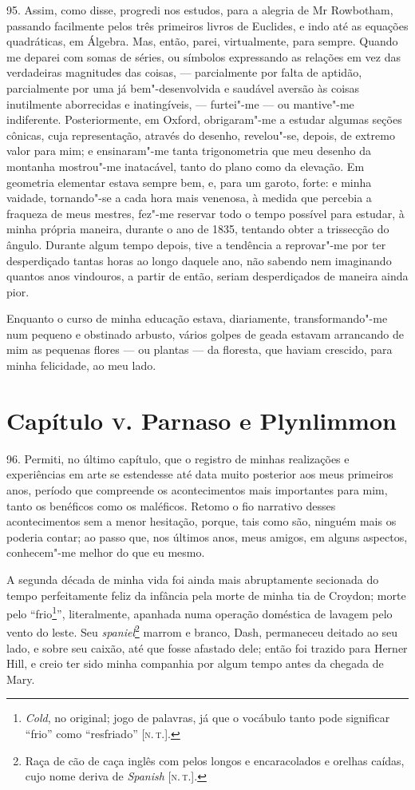 95. Assim, como disse, progredi nos estudos, para a alegria de Mr
Rowbotham, passando facilmente pelos três primeiros livros de Euclides,
e indo até as equações quadráticas, em Álgebra. Mas, então, parei,
virtualmente, para sempre. Quando me deparei com somas de séries, ou
símbolos expressando as relações em vez das verdadeiras magnitudes das
coisas, --- parcialmente por falta de aptidão, parcialmente por uma já
bem"-desenvolvida e saudável aversão às coisas inutilmente aborrecidas e
inatingíveis, --- furtei"-me --- ou mantive"-me indiferente. Posteriormente,
em Oxford, obrigaram"-me a estudar algumas seções cônicas, cuja
representação, através do desenho, revelou"-se, depois, de extremo valor
para mim; e ensinaram"-me tanta trigonometria que meu desenho da montanha
mostrou"-me inatacável, tanto do plano como da elevação. Em geometria
elementar estava sempre bem, e, para um garoto, forte: e minha vaidade,
tornando"-se a cada hora mais venenosa, à medida que percebia a fraqueza
de meus mestres, fez"-me reservar todo o tempo possível para estudar, à
minha própria maneira, durante o ano de 1835, tentando obter a
trissecção do ângulo. Durante algum tempo depois, tive a tendência a
reprovar"-me por ter desperdiçado tantas horas ao longo daquele ano, não
sabendo nem imaginando quantos anos vindouros, a partir de então, seriam
desperdiçados de maneira ainda pior.

Enquanto o curso de minha educação estava, diariamente, transformando"-me
num pequeno e obstinado arbusto, vários golpes de geada estavam
arrancando de mim as pequenas flores --- ou plantas --- da floresta, que
haviam crescido, para minha felicidade, ao meu lado.

\chapter{Capítulo \textsc{v}. Parnaso e Plynlimmon}

96. Permiti, no último capítulo, que o registro de minhas realizações e
experiências em arte se estendesse até data muito posterior aos meus
primeiros anos, período que compreende os acontecimentos mais
importantes para mim, tanto os benéficos como os maléficos. Retomo o fio
narrativo desses acontecimentos sem a menor hesitação, porque, tais como
são, ninguém mais os poderia contar; ao passo que, nos últimos anos,
meus amigos, em alguns aspectos, conhecem"-me melhor do que eu mesmo.

A segunda década de minha vida foi ainda mais abruptamente secionada do
tempo perfeitamente feliz da infância pela morte de minha tia de
Croydon; morte pelo ``frio\footnote{\emph{Cold}, no original; jogo de
  palavras, já que o vocábulo tanto pode significar ``frio'' como
  ``resfriado'' {[}\textsc{n.\,t.}{]}.}'', literalmente, apanhada numa operação
doméstica de lavagem pelo vento do leste. Seu \emph{spaniel}\footnote{Raça
  de cão de caça inglês com pelos longos e encaracolados e orelhas
  caídas, cujo nome deriva de \emph{Spanish} {[}\textsc{n.\,t.}{]}.} marrom e
branco, Dash, permaneceu deitado ao seu lado, e sobre seu caixão, até
que fosse afastado dele; então foi trazido para Herner Hill, e creio ter
sido minha companhia por algum tempo antes da chegada de Mary.

